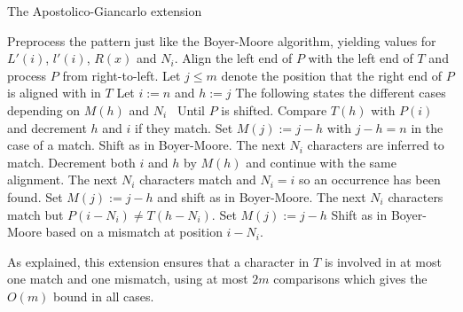 \begin{algorithm}[ht!]
\caption{The Apostolico-Giancarlo extension}\label{alg:apostolicogiancarlo}
\begin{algorithmic}
\State Preprocess the pattern just like the Boyer-Moore algorithm, yielding values for $L'(i)$, $l'(i)$, $R(x)$ and $N_i$. 
\State Align the left end of $P$ with the left end of $T$ and process $P$ from right-to-left. 
\State Let $j\leq m$ denote the position that the right end of $P$ is aligned with in $T$
    \State Let $i:=n$ and $h:=j$
    \State The following states the different cases depending on $M(h)$ and $N_i$
    \Loop\ Until $P$ is shifted. 
        \State Compare $T(h)$ with $P(i)$ and decrement $h$ and $i$ if they match. 
        \State Set $M(j):=j-h$ with $j-h=n$ in the case of a match. 
        \State Shift as in Boyer-Moore. 
        \EndIf
        \State The next $N_i$ characters are inferred to match. 
        \State Decrement both $i$ and $h$ by $M(h)$ and continue with the same alignment. 
        \State The next $N_i$ characters match and $N_i=i$ so an occurrence has been found. 
        \State Set $M(j):=j-h$ and shift as in Boyer-Moore. 
        \State The next $N_i$ characters match but $P(i-N_i)\neq T(h-N_i)$. 
        \State Set $M(j):=j-h$ 
        \State Shift as in Boyer-Moore based on a mismatch at position $i-N_i$. 
    \EndIf
    \EndLoop
\EndFor
\end{algorithmic}
\end{algorithm}

As explained, this extension ensures that a character in $T$ is involved in at most one match and one mismatch, using at most $2m$ comparisons which gives the $O(m)$ bound in all cases. 

